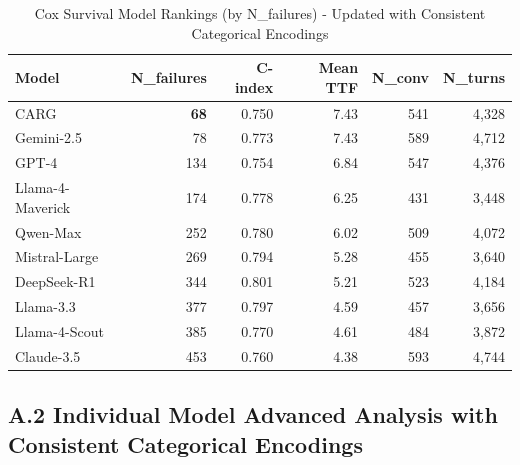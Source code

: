 \documentclass[letterpaper]{article}
\begin{document}
\begin{table}[ht]
\centering
\caption{Cox Survival Model Rankings (by N\_failures) - Updated with Consistent Categorical Encodings}
\label{tab:survival_results_detailed}
\begin{tabular}{lrrrrr}
\toprule
\textbf{Model} & \textbf{N\_failures} & \textbf{C-index} & \textbf{Mean TTF} & \textbf{N\_conv} & \textbf{N\_turns} \\
\midrule
CARG & \textbf{68} & 0.750 & 7.43 & 541 & 4,328 \\
Gemini-2.5 & 78 & 0.773 & 7.43 & 589 & 4,712 \\
GPT-4 & 134 & 0.754 & 6.84 & 547 & 4,376 \\
Llama-4-Maverick & 174 & 0.778 & 6.25 & 431 & 3,448 \\
Qwen-Max & 252 & 0.780 & 6.02 & 509 & 4,072 \\
Mistral-Large & 269 & 0.794 & 5.28 & 455 & 3,640 \\
DeepSeek-R1 & 344 & 0.801 & 5.21 & 523 & 4,184 \\
Llama-3.3 & 377 & 0.797 & 4.59 & 457 & 3,656 \\
Llama-4-Scout & 385 & 0.770 & 4.61 & 484 & 3,872 \\
Claude-3.5 & 453 & 0.760 & 4.38 & 593 & 4,744 \\
\bottomrule
\end{tabular}
\end{table}

\subsection*{A.2 Individual Model Advanced Analysis with Consistent Categorical Encodings}
\end{document}
